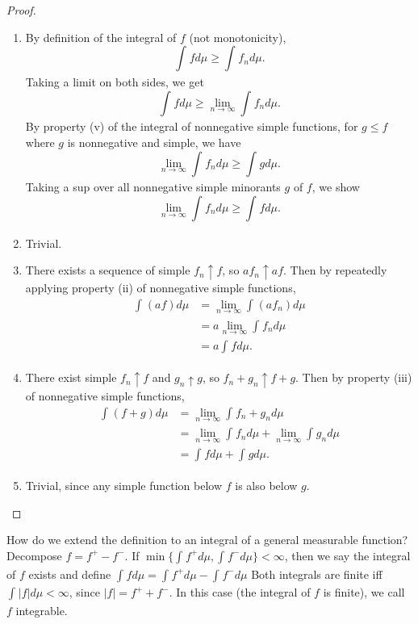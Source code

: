 \begin{proof}
	\begin{enumerate}[label=(\roman*)]
		\item 	By definition of the integral of $f$ (not monotonicity), \[
		\int_{}^{}fd\mu \ge \int_{}^{} f_n d\mu  
	.\] Taking a limit on both sides, we get \[
		\int_{}^{}  fd\mu \ge \lim\limits_{n \to \infty} \int_{}^{}  f_n d\mu
	.\] By property (v) of the integral of nonnegative simple functions, for $g \le f$ where $g$ is nonnegative and simple, we have \[
		\lim\limits_{n \to \infty} \int_{}^{} f_n d\mu \ge \int_{}^{} g d\mu  
	.\] Taking a sup over all nonnegative simple minorants $g$ of $f$, we show \[
		\lim\limits_{n \to \infty} \int_{}^{}  f_n d\mu \ge \int_{}^{} fd\mu 
	.\] 

		\item Trivial.
		\item There exists a sequence of simple $f_n \uparrow f$, so $af_n \uparrow af$. Then by repeatedly applying property (ii) of nonnegative simple functions, 
			\begin{align*}
				\int_{}^{} (af) d\mu &= \lim\limits_{n \to \infty} \int_{}^{} \left( af_n \right)d\mu  \\
				&= a \lim\limits_{n \to \infty} \int_{}^{} f_n d\mu  \\
				&= a \int_{}^{} fd\mu 
			.\end{align*}
		\item There exist simple $f_n \uparrow f$ and $g_n \uparrow g$, so $f_n + g_n \uparrow f + g$. Then by property (iii) of nonnegative simple functions, \begin{align*}
			\int_{}^{} (f+g) d\mu &= \lim\limits_{n \to \infty} \int_{}^{} f_n + g_n d\mu  \\
			&= \lim\limits_{n \to \infty} \int_{}^{} f_n d\mu + \lim\limits_{n \to \infty} \int_{}^{} g_n d\mu   \\
			&= \int_{} fd\mu + \int_{}^{} gd\mu  
		.\end{align*}
		\item Trivial, since any simple function below $f$ is also below $g$.
	\end{enumerate}
\end{proof}

How do we extend the definition to an integral of a general measurable function? Decompose $f = f^+ - f^-$. If $\min\{\int_{}^{} f^+ d\mu, \int_{}^{} f^- d\mu  \} < \infty$, then we say the integral of $f$ exists and define $\int_{}^{} fd\mu = \int_{} f^+ d\mu - \int_{}^{} f^- d\mu   $
Both integrals are finite iff $\int_{}^{} \left| f \right|d\mu < \infty$, since $\left| f \right| = f^+ + f^-$. In this case (the integral of $f$ is finite), we call $f$ integrable.


